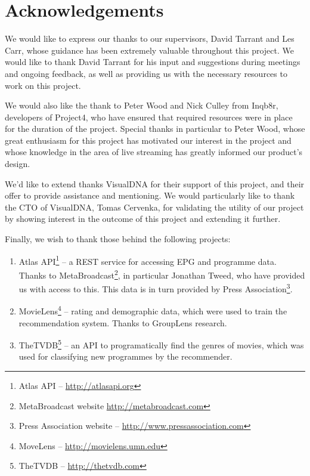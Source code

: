 \section{Acknowledgements}

We would like to express our thanks to our supervisors, David Tarrant and Les Carr, whose guidance has been extremely valuable throughout this project. We would like to thank David Tarrant for his input and suggestions during meetings and ongoing feedback, as well as providing us with the necessary resources to work on this project.

We would also like the thank to Peter Wood and Nick Culley from Inqb8r, developers of Project4, who have ensured that required resources were in place for the duration of the project. Special thanks in particular to Peter Wood, whose great enthusiasm for this project has motivated our interest in the project and whose knowledge in the area of live streaming has greatly informed our product's design.

We'd like to extend thanks VisualDNA for their support of this project, and their offer to provide assistance and mentioning. We would particularly like to thank the CTO of VisualDNA, Tomas Cervenka, for validating the utility of our project by showing interest in the outcome of this project and extending it further.

Finally, we wish to thank those behind the following projects:
\begin{enumerate}
\item Atlas API\footnote{Atlas API -- \url{http://atlasapi.org}} -- a REST service for accessing EPG and programme data. Thanks to MetaBroadcast\footnote{MetaBroadcast website \url{http://metabroadcast.com}}, in particular Jonathan Tweed, who have provided us with access to this. This data is in turn provided by Press Association\footnote{Press Association website -- \url{http://www.pressassociation.com}}.
\item MovieLens\footnote{MoveLens -- \url{http://movielens.umn.edu}} -- rating and demographic data, which were used to train the recommendation system. Thanks to GroupLens research.
\item TheTVDB\footnote{TheTVDB -- \url{http://thetvdb.com}} -- an API to programatically find the genres of movies, which was used for classifying new programmes by the recommender.
\end{enumerate}

\cleardoublepage
\setcounter{tocdepth}{2}

\begin{comment}
	\tableofcontents
	\newpage
	\cleardoublepage
	\setcounter{page}{0}
	\pagenumbering{arabic}
	\cleardoublepage
\end{comment}


